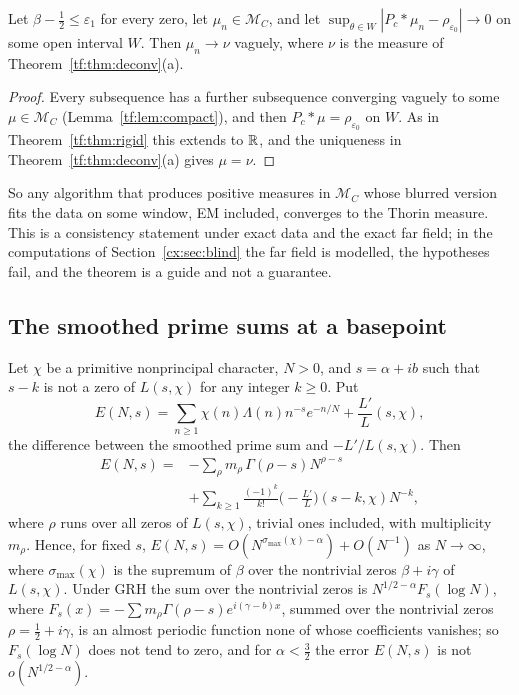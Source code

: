 \begin{theorem}\label{tf:thm:stab}
Let $\beta-\tfrac12\le\varepsilon_1$ for every zero, let $\mu_n\in\mathcal M_C$, and let $\sup_{\theta\in W}|P_c*\mu_n-\rho_{\varepsilon_0}|\to0$ on some open interval $W$. Then $\mu_n\to\nu$ vaguely, where $\nu$ is the measure of Theorem~\ref{tf:thm:deconv}(a).
\end{theorem}

\begin{proof}
Every subsequence has a further subsequence converging vaguely to some $\mu\in\mathcal M_C$ (Lemma~\ref{tf:lem:compact}), and then $P_c*\mu=\rho_{\varepsilon_0}$ on $W$. As in Theorem~\ref{tf:thm:rigid} this extends to $\mathbb{R}$, and the uniqueness in Theorem~\ref{tf:thm:deconv}(a) gives $\mu=\nu$.
\end{proof}

So any algorithm that produces positive measures in $\mathcal M_C$ whose blurred version fits the data on some window, EM included, converges to the Thorin measure. This is a consistency statement under exact data and the exact far field; in the computations of Section~\ref{cx:sec:blind} the far field is modelled, the hypotheses fail, and the theorem is a guide and not a guarantee.

\subsection{The smoothed prime sums at a basepoint}

\begin{proposition}\label{tf:prop:mellin}
Let $\chi$ be a primitive nonprincipal character, $N>0$, and $s=\alpha+ib$ such that $s-k$ is not a zero of $L(s,\chi)$ for any integer $k\ge0$. Put
\[
E(N,s)=\sum_{n\ge1}\chi(n)\Lambda(n)n^{-s}e^{-n/N}+\frac{L'}{L}(s,\chi),
\]
the difference between the smoothed prime sum and $-L'/L(s,\chi)$. Then
\begin{equation}\label{tf:eq:mellin}
\begin{aligned}
E(N,s)={}&-\sum_\rho m_\rho\,\Gamma(\rho-s)N^{\rho-s}\\
&+\sum_{k\ge1}\frac{(-1)^k}{k!}\Big(-\frac{L'}{L}\Big)(s-k,\chi)N^{-k},
\end{aligned}
\end{equation}
where $\rho$ runs over all zeros of $L(s,\chi)$, trivial ones included, with multiplicity $m_\rho$. Hence, for fixed $s$, $E(N,s)=O(N^{\sigma_{\max}(\chi)-\alpha})+O(N^{-1})$ as $N\to\infty$, where $\sigma_{\max}(\chi)$ is the supremum of $\beta$ over the nontrivial zeros $\beta+i\gamma$ of $L(s,\chi)$. Under GRH the sum over the nontrivial zeros is $N^{1/2-\alpha}F_s(\log N)$, where $F_s(x)=-\sum m_\rho\Gamma(\rho-s)e^{i(\gamma-b)x}$, summed over the nontrivial zeros $\rho=\tfrac12+i\gamma$, is an almost periodic function none of whose coefficients vanishes; so $F_s(\log N)$ does not tend to zero, and for $\alpha<\tfrac32$ the error $E(N,s)$ is not $o(N^{1/2-\alpha})$.
\end{proposition}

